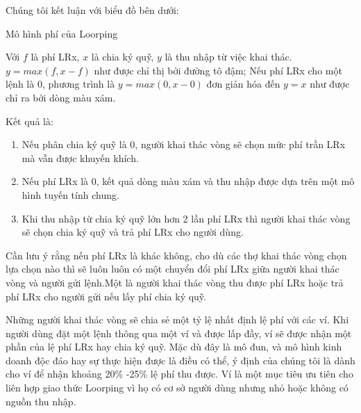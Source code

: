 \documentclass[12pt,a4paper]{article}
\makeatletter
\newenvironment{figurehere}
 {\def\@captype{figure}}
 {}
\makeatother
\begin{document}
\begin{multicols}{2}
Chúng tôi kết luận với biểu đồ bên dưới:
\begin{center}
\begin{figurehere}
\centering
{}
\caption{Mô hình phí của Loorping}
\label{fig:feemodel}
\end{figurehere}
\end{center}

Với $ f $ là phí LRx, $ x $ là chia ký quỹ, $ y $ là thu nhập từ việc khai thác.  $y=max(f, x-f)$ như được chỉ thị bởi đường tô đậm; Nếu phí LRx cho một lệnh là 0, phương trình là $y=max(0, x - 0)$ đơn giản hóa đến $y=x$ như được chỉ ra bởi dòng màu xám.

Kết quả là:
\begin{enumerate}
  \item Nếu phân chia ký quỹ là 0, người khai thác vòng sẽ chọn mức phí trần LRx mà vẫn được khuyến khích.
  \item Nếu phí LRx là 0, kết quả dòng màu xám và thu nhập được dựa trên một mô hình tuyến tính chung.
  \item Khi thu nhập từ chia ký quỹ lớn hơn 2 lần phí LRx thì người khai thác vòng sẽ chọn chia ký quỹ và trả phí LRx cho người dùng.
\end{enumerate}
Cần lưu ý rằng nếu phí LRx là khác không, cho dù các thợ khai thác vòng chọn lựa chọn nào thì sẽ luôn luôn có một chuyển đổi phí LRx giữa người khai thác vòng và người gửi lệnh.Một là người khai thác vòng thu được phí LRx hoặc trả phí LRx cho người gửi nếu lấy phí chia ký quỹ.

Những người khai thác vòng sẽ chia sẻ một tỷ lệ nhất định lệ phí với các ví. Khi người dùng đặt một lệnh thông qua một ví và được lấp đầy, ví sẽ được nhận một phần của lệ phí LRx hay chia ký quỹ. Mặc dù đây là mô đun, và mô hình kinh doanh độc đáo hay sự thực hiện được là điều có thể, ý định của chúng tôi là dành cho ví để nhận khoảng 20\% -25\% lệ phí thu được. Ví là một mục tiêu ưu tiên cho liên hợp giao thức Loorping vì họ có cơ sở người dùng nhưng nhỏ hoặc không có nguồn thu nhập.


\end{multicols}
\end{document}
